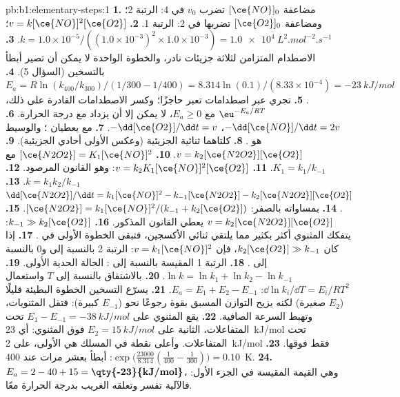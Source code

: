 \begin{solution}{pb:b1:elementary-steps:1}
\textbf{1.} مضاعفة $[\ce{NO}]_0$ تضرب $v_0$ في 4: الرتبة 2؛ ومضاعفة
$[\ce{O2}]_0$ تضربها في 2: الرتبة 1.
\textbf{2.} $v = k[\ce{NO}]^2[\ce{O2}]$؛ $k = 1.0 \times 10^{-5}/((1.0
\times 10^{-3})^2 \times 1.0 \times 10^{-3}) =
\qty{1.0e4}{L^2.mol^{-2}.s^{-1}}$.
\textbf{3.} الاصطدام المتزامن لثلاثة جزيئات نادر، والخطوة
الواحدة لا يمكن أن تصير أبطأ بالتسخين (السؤال 5).
\textbf{4.} $E_a = R\ln(k_{400}/k_{300})/(1/300 - 1/400) = 8.314 \ln(0.1)
/(8.33 \times 10^{-4}) = \qty{-23}{kJ/mol}$.
\textbf{5.} تجري  عبر اصطدامات تعبر
حاجزًا؛ وكسر الاصطدامات القادرة على ذلك، $\eu^{-E_a/RT}$ مع $E_a \ge
0$، لا يمكن إلا أن يزداد مع درجة الحرارة.
\textbf{6.} $-\dd[\ce{NO}]/\dd t = 2v$، $-\dd[\ce{O2}]/\dd t = v$.
\textbf{7.}  مع  يعطيان
؛ والوسيط هو .
\textbf{8.} كلتاهما ثنائية الجزيئية (وعكس الأولى أحادي الجزيئية).
\textbf{9.} $v = k_2[\ce{N2O2}][\ce{O2}]$.
\textbf{10.} $[\ce{N2O2}] = K_1[\ce{NO}]^2$ مع $K_1 = k_1/k_{-1}$.
\textbf{11.} $v = k_2K_1[\ce{NO}]^2[\ce{O2}]$: وهو القانون المرصود.
\textbf{12.} $k = k_1k_2/k_{-1}$.
\textbf{13.} $\dd[\ce{N2O2}]/\dd t = k_1[\ce{NO}]^2 - k_{-1}[\ce{N2O2}] -
k_2[\ce{N2O2}][\ce{O2}]$.
\textbf{14.} بمساواته بالصفر: $[\ce{N2O2}] = k_1[\ce{NO}]^2/(k_{-1} +
k_2[\ce{O2}])$.
\textbf{15.} $v = k_2[\ce{N2O2}][\ce{O2}]$ يعطي القانون المذكور.
\textbf{16.} $k_{-1} \gg k_2[\ce{O2}]$: يتفكك المثنوي أكثر بكثير
مما يلتقي ثنائي الأكسجين، فتبقى الخطوة الأولى في .
\textbf{17.} إذا كان $k_2[\ce{O2}] \gg k_{-1}$، فإن $v = k_1[\ce{NO}]^2$: الرتبة 2 بالنسبة إلى
 و0 بالنسبة إلى .
\textbf{18.} الرتبة 1 المقيسة بالنسبة إلى : الحالة الحدية الأولى.
\textbf{19.} $\ln k = \ln k_1 + \ln k_2 - \ln k_{-1}$.
\textbf{20.} بالاشتقاق بالنسبة إلى $T$ واستعمال $\dd\ln k_i/\dd T
= E_i/RT^2$: $E_a = E_1 + E_2 - E_{-1}$.
\textbf{21.} يسرّع التسخين الخطوة البطيئة قليلًا ($E_2$ صغيرة) لكنه يزيح
التوازن المسبق بقوة رجوعًا نحو  ($E_{-1}$ كبيرة): فتقل
المثنويات، وتهبط السرعة الصافية.
\textbf{22.} يقع المثنوي على $E_1 - E_{-1} = \qty{-38}{kJ/mol}$ تحت
المتفاعلات،  الثانية على $E_2 = \qty{15}{kJ/mol}$ فوق
المثنوي: أي \qty{23}{kJ/mol} تحت المتفاعلات. وأعلى نقطة في
المسلك هي  الأولى، على \qty{2}{kJ/mol} فقط فوقها.
\textbf{23.} $\exp\big(\frac{23000}{8.314}(\frac{1}{400} - \frac{1}{300})\big)
= 0.10$: أبطأ بعشر مرات عند \qty{400}{K}.
\textbf{24.} $E_a = 2 - 40 + 15 = \textbf{\qty{-23}{kJ/mol}}$، وهي القيمة
المقيسة في الجزء الأول: فالآلية تفسر  وتعلقه الغريب
بدرجة الحرارة معًا.
\end{solution}
